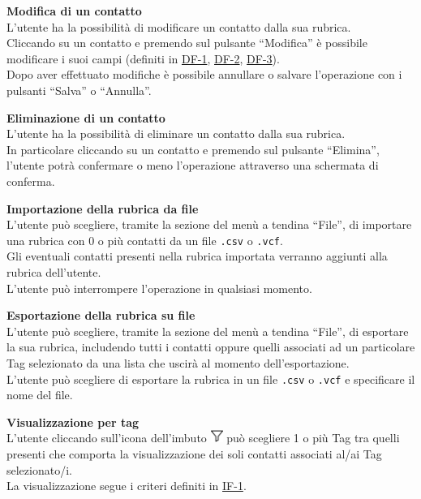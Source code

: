\begin{tcolorbox}[breakable, colback=white,colframe=black!80!white,title=\textbf{Funzionalità individuali IF}]
\begin{itemize}[itemsep=2pt, topsep=0pt]
		\item[\textbf{IF-5}] \textbf{Modifica di un contatto}
		\\L’utente ha la possibilità di modificare un contatto dalla sua rubrica.
		\\Cliccando su un contatto e premendo sul pulsante “Modifica” è possibile modificare i suoi campi (definiti in \hyperlink{DF-1}{DF-1}, \hyperlink{DF-2}{DF-2}, \hyperlink{DF-3}{DF-3}). 
		\\Dopo aver effettuato modifiche è possibile annullare o salvare l’operazione con i pulsanti “Salva” o “Annulla”.
		
		\item[\textbf{IF-6}] \textbf{Eliminazione di un contatto}
		\\L’utente ha la possibilità di eliminare un contatto dalla sua rubrica. 
		\\In particolare cliccando su un contatto e premendo sul pulsante “Elimina”, l’utente potrà confermare o meno l’operazione attraverso una schermata di conferma.
		
		\item[\textbf{IF-7}] \textbf{Importazione della rubrica da file}
		\\L’utente può scegliere, tramite la sezione del menù a tendina “File”, di importare una rubrica con 0 o più contatti da un file \texttt{.csv} o \texttt{.vcf}. 
		\\Gli eventuali contatti presenti nella rubrica importata verranno aggiunti alla rubrica dell’utente. 
		\\L’utente può interrompere l’operazione in qualsiasi momento.
	
		\item[\textbf{IF-8}] \textbf{Esportazione della rubrica su file}
		\\L’utente può scegliere, tramite la sezione del menù a tendina “File”, di esportare la sua rubrica, includendo tutti i contatti oppure quelli associati ad un particolare Tag selezionato da una lista che uscirà al momento dell’esportazione.
		\\L’utente può scegliere di esportare la rubrica in un file \texttt{.csv} o \texttt{.vcf} e specificare il nome del file. 
		
		\hypertarget{IF-9}{\item[\textbf{IF-9}]} \textbf{Visualizzazione per tag}
		\\L’utente cliccando sull’icona dell’imbuto \includegraphics[height=0.4cm]{images/imbuto_icona.jpeg} può scegliere 1 o più Tag tra quelli presenti che comporta la visualizzazione dei soli contatti associati al/ai Tag selezionato/i.
		\\La visualizzazione segue i criteri definiti in \hyperlink{IF-1}{IF-1}.		
	\end{itemize}
\end{tcolorbox}


